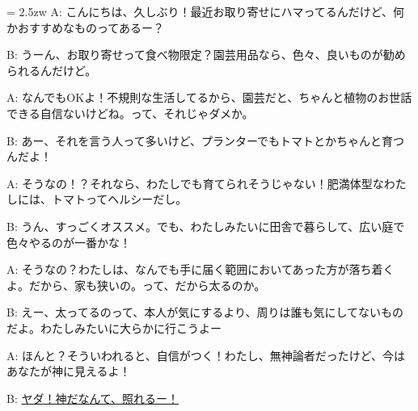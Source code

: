 \documentclass[11pt]{amsart}
\title{}
\author{}
\newenvironment{hangall}[1]{\hangindent = 2.5zw\everypar{\hangindent = 2.5zw}}{}
\begin{document}
\maketitle
\begin{hangall}{}%
A: こんにちは、久しぶり！最近お取り寄せにハマってるんだけど、何かおすすめなものってあるー？

B: うーん、お取り寄せって食べ物限定？園芸用品なら、色々、良いものが勧められるんだけど。

A: なんでもOKよ！不規則な生活してるから、園芸だと、ちゃんと植物のお世話できる自信ないけどね。って、それじゃダメか。

B: あー、それを言う人って多いけど、プランターでもトマトとかちゃんと育つんだよ！

A: そうなの！？それなら、わたしでも育てられそうじゃない！肥満体型なわたしには、トマトってヘルシーだし。

B: うん、すっごくオススメ。でも、わたしみたいに田舎で暮らして、広い庭で色々やるのが一番かな！

A: そうなの？わたしは、なんでも手に届く範囲においてあった方が落ち着くよ。だから、家も狭いの。って、だから太るのか。

B: えー、太ってるのって、本人が気にするより、周りは誰も気にしてないものだよ。わたしみたいに大らかに行こうよー

A: ほんと？そういわれると、自信がつく！わたし、無神論者だったけど、今はあなたが神に見えるよ！

B: \ul{ヤダ！神だなんて、照れるー！}\end{hangall}
\end{document}
